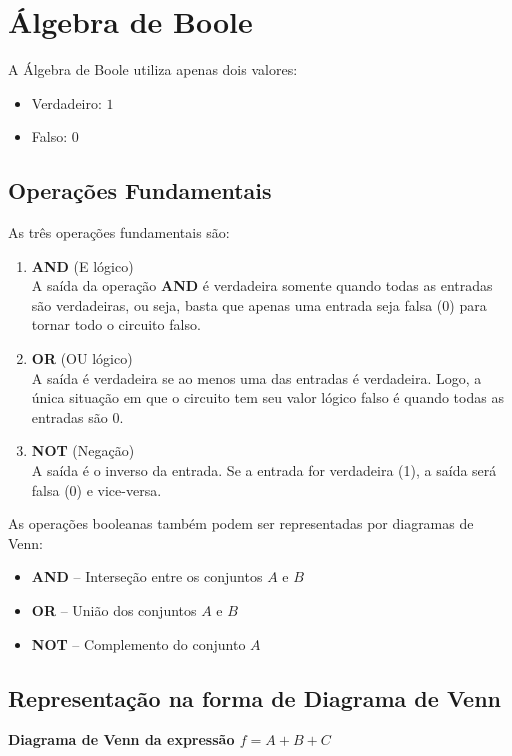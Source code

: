 \documentclass[12pt]{article}
\begin{document}
\section{Álgebra de Boole}

A Álgebra de Boole utiliza apenas dois valores:
\begin{itemize}
   \item Verdadeiro: $1$
   \item Falso: $0$
\end{itemize}

\subsection{Operações Fundamentais}
As três operações fundamentais são:

\begin{enumerate}
   \item \textbf{AND} (E lógico) \\
   A saída da operação \textbf{AND} é verdadeira somente quando todas as entradas são verdadeiras, ou seja, basta que apenas uma entrada seja falsa (0) para tornar todo o circuito falso. 
   \item \textbf{OR} (OU lógico) \\
   A saída é verdadeira se ao menos uma das entradas é verdadeira. Logo, a única situação em que o circuito tem seu valor lógico falso é quando todas as entradas são 0.
   \item \textbf{NOT} (Negação) \\
   A saída é o inverso da entrada. Se a entrada for verdadeira (1), a saída será falsa (0) e vice-versa.
\end{enumerate} 

\begin{tcolorbox}[mynote, title= Observação: Relação com Diagrama de Venn]
As operações booleanas também podem ser representadas por diagramas de Venn:
\begin{itemize}
   \item \textbf{AND} – Interseção entre os conjuntos $A$ e $B$
   \item \textbf{OR} – União dos conjuntos $A$ e $B$
   \item \textbf{NOT} – Complemento do conjunto $A$
\end{itemize}
\end{tcolorbox}

\vspace{0.2cm}

\subsection{Representação na forma de Diagrama de Venn} 
\begin{center}
\textbf{Diagrama de Venn da expressão $f = A + B + C$}
\end{center}
\end{document}
